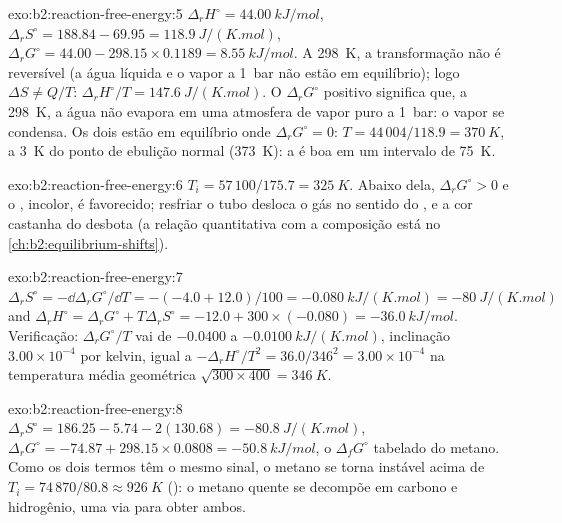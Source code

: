 \begin{solution}{exo:b2:reaction-free-energy:5}
$\Delta_r H^\circ = \qty{44.00}{kJ/mol}$, $\Delta_r S^\circ = 188.84 - 69.95 =
\qty{118.9}{J/(K.mol)}$, $\Delta_r G^\circ = 44.00 - 298.15 \times 0.1189 =
\qty{+8.55}{kJ/mol}$. A \qty{298}{K}, a transformação não é reversível (a água
líquida e o vapor a \qty{1}{bar} não estão em equilíbrio); logo $\Delta S \ne
Q/T$: $\Delta_r H^\circ/T = \qty{147.6}{J/(K.mol)}$. O $\Delta_r G^\circ$
positivo significa que, a \qty{298}{K}, a água não evapora em uma atmosfera
de vapor puro a \qty{1}{bar}: o vapor se condensa. Os dois
estão em equilíbrio onde $\Delta_r G^\circ = 0$: $T = 44\,004/118.9 =
\qty{370}{K}$, a \qty{3}{K} do ponto de ebulição normal
(\qty{373}{K}): a  é boa em um intervalo de \qty{75}{K}.
\end{solution}

\begin{solution}{exo:b2:reaction-free-energy:6}
$T_i = 57\,100/175.7 = \qty{325}{K}$. Abaixo dela, $\Delta_r G^\circ > 0$ e o
, incolor, é favorecido; resfriar o tubo desloca o gás no sentido do
, e a cor castanha do  desbota (a relação quantitativa com
a composição está no \cref{ch:b2:equilibrium-shifts}).
\end{solution}

\begin{solution}{exo:b2:reaction-free-energy:7}
$\Delta_r S^\circ = -\dd\Delta_r G^\circ/\dd T = -(-4.0 + 12.0)/100 =
\qty{-0.080}{kJ/(K.mol)} = \qty{-80}{J/(K.mol)}$ and $\Delta_r H^\circ =
\Delta_r G^\circ + T\Delta_r S^\circ = -12.0 + 300 \times (-0.080) =
\qty{-36.0}{kJ/mol}$. Verificação: $\Delta_r G^\circ/T$ vai de $-0.0400$ a
$\qty{-0.0100}{kJ/(K.mol)}$, inclinação $3.00 \times 10^{-4}$ por kelvin, igual a
$-\Delta_r H^\circ/T^2 = 36.0/346^2 = 3.00 \times 10^{-4}$ na temperatura
média geométrica $\sqrt{300 \times 400} = \qty{346}{K}$.
\end{solution}

\begin{solution}{exo:b2:reaction-free-energy:8}
$\Delta_r S^\circ = 186.25 - 5.74 - 2(130.68) = \qty{-80.8}{J/(K.mol)}$,
$\Delta_r G^\circ = -74.87 + 298.15 \times 0.0808 = \qty{-50.8}{kJ/mol}$,
o $\Delta_f G^\circ$ tabelado do metano. Como os dois termos têm o mesmo
sinal, o metano se torna instável acima de $T_i = 74\,870/80.8 \approx
\qty{926}{K}$ (): o metano quente se decompõe em
carbono e hidrogênio, uma via para obter ambos.
\end{solution}

